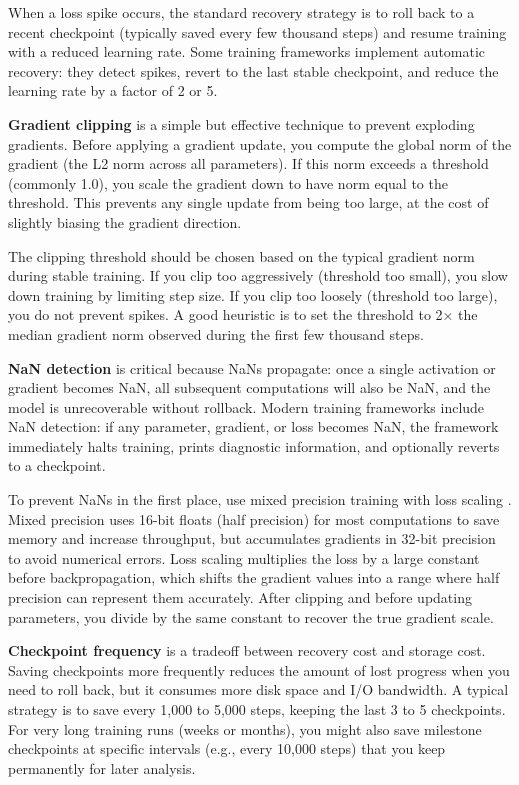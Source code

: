 When a loss spike occurs, the standard recovery strategy is to roll back to a recent checkpoint (typically saved every few thousand steps) and resume training with a reduced learning rate. Some training frameworks implement automatic recovery: they detect spikes, revert to the last stable checkpoint, and reduce the learning rate by a factor of 2 or 5.

\textbf{Gradient clipping} is a simple but effective technique to prevent exploding gradients. Before applying a gradient update, you compute the global norm of the gradient (the L2 norm across all parameters). If this norm exceeds a threshold (commonly 1.0), you scale the gradient down to have norm equal to the threshold. This prevents any single update from being too large, at the cost of slightly biasing the gradient direction.

The clipping threshold should be chosen based on the typical gradient norm during stable training. If you clip too aggressively (threshold too small), you slow down training by limiting step size. If you clip too loosely (threshold too large), you do not prevent spikes. A good heuristic is to set the threshold to 2× the median gradient norm observed during the first few thousand steps.

\textbf{NaN detection} is critical because NaNs propagate: once a single activation or gradient becomes NaN, all subsequent computations will also be NaN, and the model is unrecoverable without rollback. Modern training frameworks include NaN detection: if any parameter, gradient, or loss becomes NaN, the framework immediately halts training, prints diagnostic information, and optionally reverts to a checkpoint.

To prevent NaNs in the first place, use mixed precision training with loss scaling \citep{micikevicius2018mixedprecision}. Mixed precision uses 16-bit floats (half precision) for most computations to save memory and increase throughput, but accumulates gradients in 32-bit precision to avoid numerical errors. Loss scaling multiplies the loss by a large constant before backpropagation, which shifts the gradient values into a range where half precision can represent them accurately. After clipping and before updating parameters, you divide by the same constant to recover the true gradient scale.

\textbf{Checkpoint frequency} is a tradeoff between recovery cost and storage cost. Saving checkpoints more frequently reduces the amount of lost progress when you need to roll back, but it consumes more disk space and I/O bandwidth. A typical strategy is to save every 1,000 to 5,000 steps, keeping the last 3 to 5 checkpoints. For very long training runs (weeks or months), you might also save milestone checkpoints at specific intervals (e.g., every 10,000 steps) that you keep permanently for later analysis.

